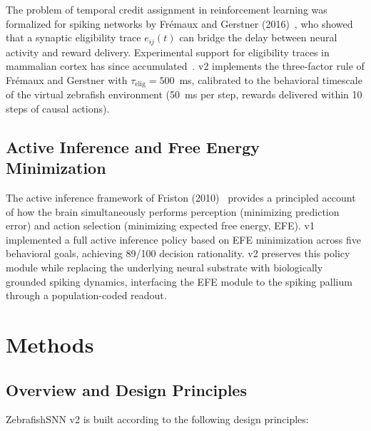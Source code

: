 \documentclass[11pt,a4paper]{article}
\begin{document}
The problem of temporal credit assignment in reinforcement learning
was formalized for spiking networks by Fr\'{e}maux and Gerstner (2016)~\cite{fremaux2016},
who showed that a synaptic eligibility trace $e_{ij}(t)$ can bridge the
delay between neural activity and reward delivery.
Experimental support for eligibility traces in mammalian cortex has since
accumulated~\cite{fremaux2016}.
v2 implements the three-factor rule of Fr\'{e}maux and Gerstner
with $\tau_\mathrm{elig} = 500$~ms, calibrated to the behavioral timescale
of the virtual zebrafish environment (50~ms per step, rewards delivered
within 10 steps of causal actions).

\subsection{Active Inference and Free Energy Minimization}

The active inference framework of Friston (2010)~\cite{friston2010}
provides a principled account of how the brain simultaneously performs
perception (minimizing prediction error) and action selection (minimizing
expected free energy, EFE).
v1 implemented a full active inference policy based on EFE minimization
across five behavioral goals, achieving 89/100 decision rationality.
v2 preserves this policy module while replacing the underlying neural
substrate with biologically grounded spiking dynamics, interfacing the
EFE module to the spiking pallium through a population-coded readout.

\section{Methods}\label{sec:methods}

\subsection{Overview and Design Principles}\label{sec:overview}

ZebrafishSNN v2 is built according to the following design principles:
\end{document}
